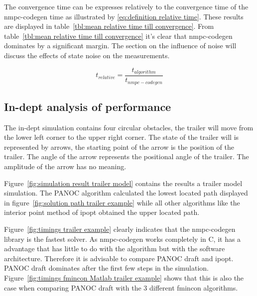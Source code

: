 The convergence time can be expresses relatively to the convergence time of the nmpc-codegen time as illustrated by \eqref{eq:definition relative time}. These results are displayed in table~\ref{tbl:mean relative time till convergence}. From table~\ref{tbl:mean relative time till convergence} it's clear that nmpc-codegen dominates by a significant margin. The section on the influence of noise will discuss the effects of state noise on the measurements.

\begin{equation}
	t_{relative} = \frac{t_{algorithm}}{t_{nmpc-codegen}}
	\label{eq:definition relative time}
\end{equation}

\subsection{In-dept analysis of performance}
The in-dept simulation contains four circular obstacles, the trailer will move from the lower left corner to the upper right corner. The state of the trailer will is represented by arrows, the starting point of the arrow is the position of the trailer. The angle of the arrow represents the positional angle of the trailer. The amplitude of the arrow has no meaning.

Figure~\ref{fig:simulation result trailer model} contains the results a trailer model simulation. The PANOC algorithm calculated the lowest located path displayed in figure~\ref{fig:solution path trailer example} while all other algorithms like the interior point method of ipopt obtained the upper located path.

Figure~\ref{fig:timings trailer example} clearly indicates that the nmpc-codegen library is the fastest solver. As nmpc-codegen works completely in C, it has a advantage that has little to do with the algorithm but with the software architecture. Therefore it is advisable to compare PANOC draft and ipopt. PANOC draft dominates after the first few steps in the simulation. Figure~\ref{fig:timings fmincon Matlab trailer example} shows that this is also the case when comparing PANOC draft with the 3 different fmincon algorithms.

